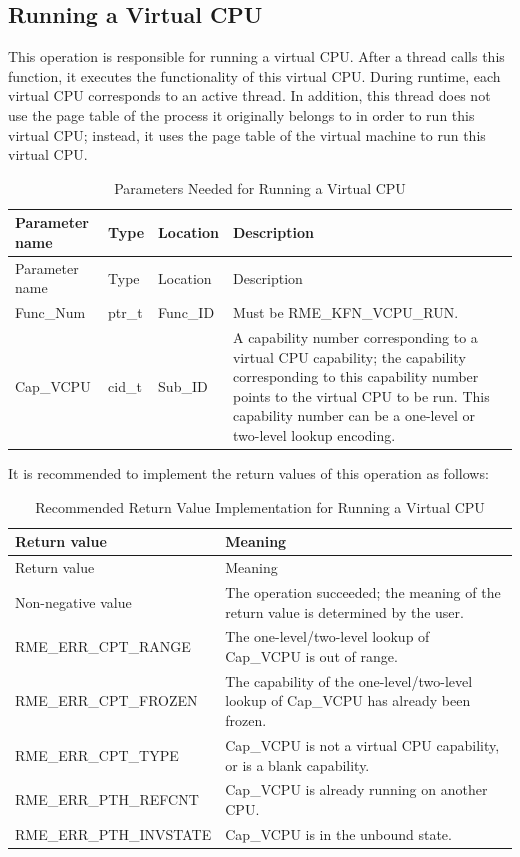 \subsection{Running a Virtual CPU}\label{subsec:8-run-virtual-cpu}

This operation is responsible for running a virtual CPU. After a thread calls this function, it executes the functionality of this virtual CPU. During runtime, each virtual CPU corresponds to an active thread. In addition, this thread does not use the page table of the process it originally belongs to in order to run this virtual CPU; instead, it uses the page table of the virtual machine to run this virtual CPU.

\begin{xltabular}{\textwidth}{@{}>{\hsize\raggedright\arraybackslash}X>{\hsize\raggedright\arraybackslash}X>{\hsize\raggedright\arraybackslash}X>{\hsize\raggedright\arraybackslash}X@{}}
\caption{Parameters Needed for Running a Virtual CPU}\label{tab:8-91-run-virtual-cpu-parameters}\\
\toprule
Parameter name & Type & Location & Description\tabularnewline
\endfirsthead
\toprule
Parameter name & Type & Location & Description\tabularnewline
\midrule
\endhead
\bottomrule
\endlastfoot
Func\_Num & ptr\_t & Func\_ID &
Must be RME\_KFN\_VCPU\_RUN.\tabularnewline
Cap\_VCPU & cid\_t & Sub\_ID &
A capability number corresponding to a virtual CPU capability; the capability corresponding to this capability number points to the virtual CPU to be run. This capability number can be a one-level or two-level lookup encoding.\tabularnewline
\end{xltabular}
\nopagebreak[4]

\newpage
{}
It is recommended to implement the return values of this operation as follows:

\begin{xltabular}{\textwidth}{@{}>{\hsize\raggedright\arraybackslash}X>{\hsize\raggedright\arraybackslash}X@{}}
\caption{Recommended Return Value Implementation for Running a Virtual CPU}\label{tab:8-92-run-virtual-cpu-suggested-return-values}\\
\toprule
Return value & Meaning\tabularnewline
\endfirsthead
\toprule
Return value & Meaning\tabularnewline
\midrule
\endhead
\bottomrule
\endlastfoot
    Non-negative value & The operation succeeded; the meaning of the return value is determined by the user.\tabularnewline
    RME\_ERR\_CPT\_RANGE & The one-level/two-level lookup of Cap\_VCPU is out of range.\tabularnewline
    RME\_ERR\_CPT\_FROZEN & The capability of the one-level/two-level lookup of Cap\_VCPU has already been frozen.\tabularnewline
    RME\_ERR\_CPT\_TYPE & Cap\_VCPU is not a virtual CPU capability, or is a blank capability.\tabularnewline
    RME\_ERR\_PTH\_REFCNT & Cap\_VCPU is already running on another CPU.\tabularnewline
    RME\_ERR\_PTH\_INVSTATE & Cap\_VCPU is in the unbound state.\tabularnewline
\end{xltabular}
\nopagebreak[4]

